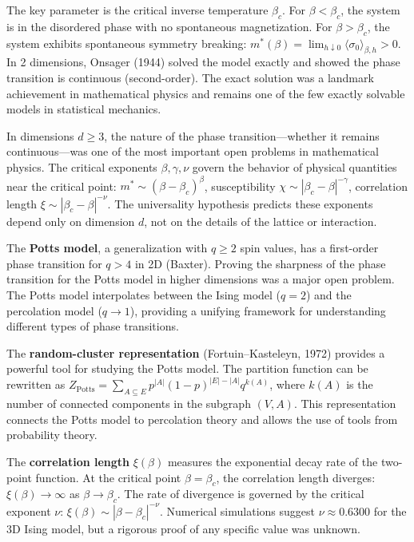 The key parameter is the critical inverse temperature $\beta_c$. For $\beta < \beta_c$, the system is in the disordered phase with no spontaneous magnetization. For $\beta > \beta_c$, the system exhibits spontaneous symmetry breaking: $m^*(\beta) = \lim_{h \downarrow 0} \langle \sigma_0 \rangle_{\beta, h} > 0$. In 2 dimensions, Onsager (1944) solved the model exactly and showed the phase transition is continuous (second-order). The exact solution was a landmark achievement in mathematical physics and remains one of the few exactly solvable models in statistical mechanics.

In dimensions $d \ge 3$, the nature of the phase transition---whether it remains continuous---was one of the most important open problems in mathematical physics. The critical exponents $\beta, \gamma, \nu$ govern the behavior of physical quantities near the critical point: $m^* \sim (\beta - \beta_c)^\beta$, susceptibility $\chi \sim |\beta_c - \beta|^{-\gamma}$, correlation length $\xi \sim |\beta_c - \beta|^{-\nu}$. The universality hypothesis predicts these exponents depend only on dimension $d$, not on the details of the lattice or interaction.

The \textbf{Potts model}, a generalization with $q \ge 2$ spin values, has a first-order phase transition for $q > 4$ in 2D (Baxter). Proving the sharpness of the phase transition for the Potts model in higher dimensions was a major open problem. The Potts model interpolates between the Ising model ($q = 2$) and the percolation model ($q \to 1$), providing a unifying framework for understanding different types of phase transitions.

The \textbf{random-cluster representation} (Fortuin--Kasteleyn, 1972) provides a powerful tool for studying the Potts model. The partition function can be rewritten as $Z_{\text{Potts}} = \sum_{A \subseteq E} p^{|A|}(1-p)^{|E|-|A|} q^{k(A)}$, where $k(A)$ is the number of connected components in the subgraph $(V, A)$. This representation connects the Potts model to percolation theory and allows the use of tools from probability theory.

The \textbf{correlation length} $\xi(\beta)$ measures the exponential decay rate of the two-point function. At the critical point $\beta = \beta_c$, the correlation length diverges: $\xi(\beta) \to \infty$ as $\beta \to \beta_c$. The rate of divergence is governed by the critical exponent $\nu$: $\xi(\beta) \sim |\beta - \beta_c|^{-\nu}$. Numerical simulations suggest $\nu \approx 0.6300$ for the 3D Ising model, but a rigorous proof of any specific value was unknown.

